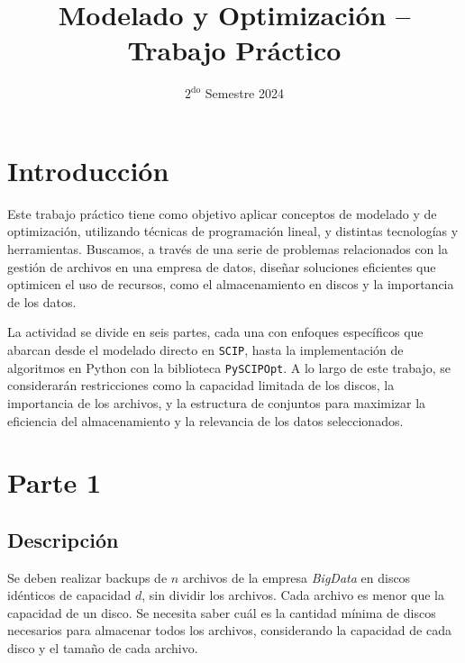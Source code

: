 \documentclass[11pt, a4paper, pdftex]{article}
\title{
	\huge Modelado y Optimización -- Trabajo Práctico\\
}
\author{
	\Xime \and \Lucifer \and \Lu
}
\date{\small $\text{2}^{\text{do}}$ Semestre 2024
}
\begin{document}
\renewcommand{\contentsname}{Contenidos}
\renewcommand{\listfigurename}{Listado de Figuras}
\renewcommand{\listtablename}{Listado de Tablas}
\renewcommand{\tablename}{Tabla}

\newcommand{\minimize}{\texttt{Minimize}\quad\,\,}
\newcommand{\maximize}{\texttt{Maximize}\quad\,\,}
\newcommand{\subjto}{\texttt{Subject to}\quad}

\maketitle

\tableofcontents

\newpage

\section{Introducción}

Este trabajo práctico tiene como objetivo aplicar conceptos de modelado
y de optimización, utilizando técnicas de programación lineal, y distintas
tecnologías y herramientas. Buscamos, a través de una serie de problemas
relacionados con la gestión de archivos en una empresa de datos, diseñar
soluciones eficientes que optimicen el uso de recursos, como el
almacenamiento en discos y la importancia de los datos.

La actividad se divide en seis partes, cada una con enfoques específicos
que abarcan desde el modelado directo en \verb|SCIP|, hasta la
implementación de algoritmos en Python con la biblioteca
\verb|PySCIPOpt|. A lo largo de este trabajo, se considerarán restricciones
como la capacidad limitada de los discos, la importancia de los archivos,
y la estructura de conjuntos para maximizar la eficiencia del
almacenamiento y la relevancia de los datos seleccionados.

\newpage
\section{Parte 1}\label{primera:parte}

\subsection{Descripción}

Se deben realizar backups de $n$ archivos de la empresa \emph{BigData}
en discos idénticos de capacidad $d$, sin dividir los archivos. Cada
archivo es menor que la capacidad de un disco. Se necesita saber cuál es
la cantidad mínima de discos necesarios para almacenar todos los
archivos, considerando la capacidad de cada disco y el tamaño de cada
archivo. 
\end{document}
